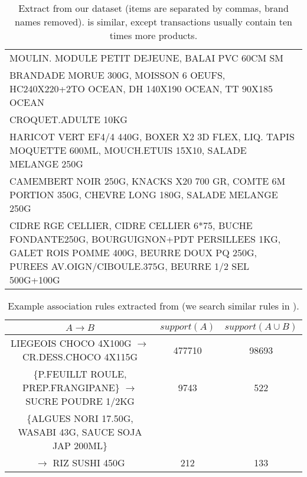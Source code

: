 \begin{table}[t!]
\centering
\begin{scriptsize}
\def\arraystretch{1.5}
\begin{tabular}{p{}}
  MOULIN. MODULE PETIT DEJEUNE, BALAI PVC 60CM SM \\
  BRANDADE MORUE 300G, MOISSON 6 OEUFS, HC240X220+2TO OCEAN, DH 140X190 OCEAN, TT 90X185 OCEAN \\
  CROQUET.ADULTE 10KG \\
  HARICOT VERT EF4/4 440G, BOXER X2 3D FLEX, LIQ. TAPIS MOQUETTE 600ML, MOUCH.ETUIS 15X10, SALADE MELANGE 250G\\
  CAMEMBERT NOIR 250G, KNACKS X20 700 GR, COMTE 6M PORTION 350G, CHEVRE LONG 180G, SALADE MELANGE 250G \\
  CIDRE RGE CELLIER, CIDRE CELLIER 6*75, BUCHE FONDANTE250G, BOURGUIGNON+PDT PERSILLEES 1KG, GALET ROIS POMME 400G, BEURRE DOUX PQ 250G, PUREES AV.OIGN/CIBOULE.375G, BEURRE 1/2 SEL 500G+100G   \\
\end{tabular}
\caption{
  Extract from our \prodassocreceipt dataset (items are separated by commas, brand names removed).
  \prodassocclient is similar, except transactions usually contain ten times more products.
  \label{tab:extracts:products}
}
\end{scriptsize}
\end{table}



\begin{table}[t!]
\centering
\begin{scriptsize}
\def\arraystretch{1.2}
\begin{tabular}{|c|c|c|}
  \hline
  $A \rightarrow B$       & $\mathit{support}(A)$ & $\mathit{support}(A \cup B)$ \\\hline
  LIEGEOIS CHOCO 4X100G $\rightarrow$  CR.DESS.CHOCO 4X115G       & \num{477710}& \num{98693}   \\
  \{P.FEUILLT ROULE, PREP.FRANGIPANE\} $\rightarrow$ SUCRE POUDRE 1/2KG & \num{9743} & \num{522}  \\
  \{ALGUES NORI 17.50G, WASABI 43G, SAUCE SOJA JAP 200ML\} & & \\
                             $\rightarrow$ RIZ SUSHI 450G & \num{212}     & \num{133}   \\
  \hline
\end{tabular}
\caption{
  Example association rules extracted from \prodassocreceipt
  (we search similar rules in \prodassocclient).
  \label{tab:extracts:products:rules}
}
\end{scriptsize}
\end{table}


